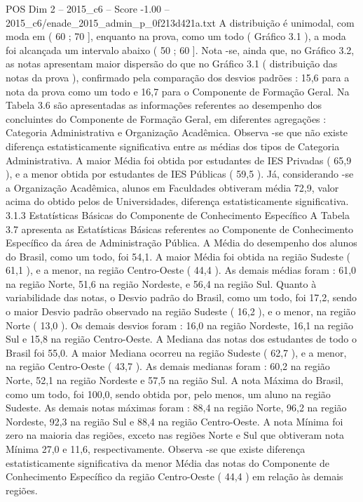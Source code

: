 \begin{textsample}{POS Dim 2 – 2015\_c6 – Score -1.00 – 2015\_c6/enade\_2015\_admin\_p\_0f213d421a.txt}
A distribuição é unimodal, com moda em ( 60 ; 70 ], enquanto na prova, como um todo ( Gráfico 3.1 ), a moda foi alcançada um intervalo abaixo ( 50 ; 60 ].
Nota -se, ainda que, no Gráfico 3.2, as notas apresentam maior dispersão do que no Gráfico 3.1 ( distribuição das notas da prova ), confirmado pela comparação dos desvios padrões : 15,6 para a nota da prova como um todo e 16,7 para o Componente de Formação Geral.
Na Tabela 3.6 são apresentadas as informações referentes ao desempenho dos concluintes do Componente de Formação Geral, em diferentes agregações : Categoria Administrativa e Organização Acadêmica.
Observa -se que não existe diferença estatisticamente significativa entre as médias dos tipos de Categoria Administrativa.
A maior Média foi obtida por estudantes de IES Privadas ( 65,9 ), e a menor obtida por estudantes de IES Públicas ( 59,5 ).
Já, considerando -se a Organização Acadêmica, alunos em Faculdades obtiveram média 72,9, valor acima do obtido pelos de Universidades, diferença estatisticamente significativa. 3.1.3 Estatísticas Básicas do Componente de Conhecimento Específico A Tabela 3.7 apresenta as Estatísticas Básicas referentes ao Componente de Conhecimento Específico da área de Administração Pública.
A Média do desempenho dos alunos do Brasil, como um todo, foi 54,1.
A maior Média foi obtida na região Sudeste ( 61,1 ), e a menor, na região Centro-Oeste ( 44,4 ).
As demais médias foram : 61,0 na região Norte, 51,6 na região Nordeste, e 56,4 na região Sul.
Quanto à variabilidade das notas, o Desvio padrão do Brasil, como um todo, foi 17,2, sendo o maior Desvio padrão observado na região Sudeste ( 16,2 ), e o menor, na região Norte ( 13,0 ).
Os demais desvios foram : 16,0 na região Nordeste, 16,1 na região Sul e 15,8 na região Centro-Oeste.
A Mediana das notas dos estudantes de todo o Brasil foi 55,0.
A maior Mediana ocorreu na região Sudeste ( 62,7 ), e a menor, na região Centro-Oeste ( 43,7 ).
As demais medianas foram : 60,2 na região Norte, 52,1 na região Nordeste e 57,5 na região Sul.
A nota Máxima do Brasil, como um todo, foi 100,0, sendo obtida por, pelo menos, um aluno na região Sudeste.
As demais notas máximas foram : 88,4 na região Norte, 96,2 na região Nordeste, 92,3 na região Sul e 88,4 na região Centro-Oeste.
A nota Mínima foi zero na maioria das regiões, exceto nas regiões Norte e Sul que obtiveram nota Mínima 27,0 e 11,6, respectivamente.
Observa -se que existe diferença estatisticamente significativa da menor Média das notas do Componente de Conhecimento Específico da região Centro-Oeste ( 44,4 ) em relação às demais regiões.

\end{textsample}
